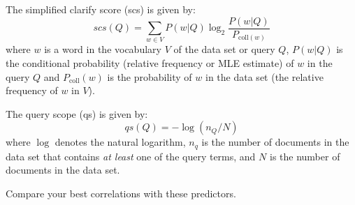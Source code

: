 \documentclass{sig-alternate}
\begin{document}
The simplified clarify score \cite{he2004inferring} (scs) is given by:
\begin{equation}
scs(Q) = \displaystyle\sum_{w\in V}P(w\vert Q)\log_2\frac{P(w\vert Q)}{P_{\text{coll}(w)}}
\end{equation}
where $w$ is a word in the vocabulary $V$ of the data set or query $Q$, $P(w\vert Q)$ is the conditional probability (relative frequency or MLE estimate) of $w$ in the query $Q$ and $P_{\text{coll}}(w)$ is the probability of $w$ in the data set (the relative frequency of $w$ in $V$).

The query scope \cite{he2004inferring} (qs) is given by:
\begin{equation}
qs(Q) = -\log(n_Q/N)
\end{equation}
where $\log$ denotes the natural logarithm, $n_q$ is the number of documents in the data set that contains \emph{at least} one of the query terms, and $N$ is the number of documents in the data set.

Compare your best correlations with these predictors.
\end{document}
